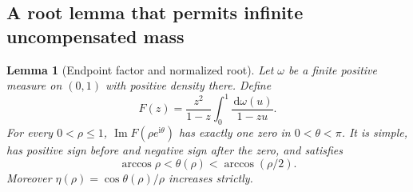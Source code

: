 \documentclass[11pt]{article}
\numberwithin{equation}{section}
\newtheorem{lemma}[theorem]{Lemma}
\theoremstyle{definition}
\theoremstyle{remark}
\DeclareMathOperator{\Impart}{Im}
\newcommand{\dd}{\,\mathrm d}
\newcommand{\ii}{\mathrm i}
\begin{document}
\subsection{A root lemma that permits infinite uncompensated mass}
\begin{lemma}[Endpoint factor and normalized root]\label{lem:root}
Let $\omega$ be a finite positive measure on $(0,1)$ with positive
density there. Define
\[
 F(z)=\frac{z^2}{1-z}\int_0^1\frac{\dd\omega(u)}{1-zu}.
\]
For every $0<\rho\le1$, $\Impart F(\rho e^{\ii\theta})$ has exactly
one zero in $0<\theta<\pi$. It is simple, has positive sign before
and negative sign after the zero, and satisfies
\begin{equation}\label{eq:stronganglerange}
 \arccos\rho<\theta(\rho)<\arccos(\rho/2).
\end{equation}
Moreover $\eta(\rho)=\cos\theta(\rho)/\rho$ increases strictly.
\end{lemma}
\end{document}
